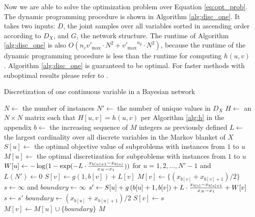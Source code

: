 
Now we are able to solve the optimization problem over Equation \ref{eq:opt_prob}.
The dynamic programming procedure is shown in Algorithm \ref{alg:disc_one}.
It takes two inputs: $D$, the joint samples over all variables sorted in ascending order according to $D_X$, and $G$, the network structure.
The runtime of Algorithm \ref{alg:disc_one} is also $O(n_c  {v'_\text{max}} \cdot N^2 + {v'_\text{max}}^{n_p} \cdot N^2)$, because the runtime of the dynamic programming procedure is less than the runtime for computing $h(u,v)$.
Algorithm \ref{alg:disc_one} is guaranteed to be optimal.
For faster methods with suboptimal results please refer to \citep{Boulle_2006}.

\begin{algorithm}
\caption{Discretization of one continuous variable in a Bayesian network}
\label{alg:disc_one}
\begin{algorithmic}[5]
\State
\State $N \leftarrow$ the number of instances
\State $N' \leftarrow$ the number of unique values in $D_X$
\State $H \leftarrow$ an $N \times N$ matrix such that $H[u,v] = h(u,v)$ per Algorithm \ref{alg:h} in the appendix
\State $b \leftarrow$ the increasing sequence of $M$ integers as previously defined
\State $L \leftarrow$ the largest cardinality over all discrete variables in the Markov blanket of $X$
\State $S[u] \leftarrow$ the optimal objective value of subproblems with instances from $1$ to $u$
\State $M[u] \leftarrow$ the optimal discretization for subproblems with instances from $1$ to $u$
\State $W[u]  \leftarrow - \log(1 - {\exp(- L \cdot{ {{x_{b(u)+1} - x_{b(u)}}\over{x_N - x_1}})}})$ for $u = 1,2, \ldots,N'-1$ and $L(N') \leftarrow 0$
\State
{}
\State $S[v] \leftarrow g \left(1,b[v] \right) + L[v]$
\State $M[v] \leftarrow \{ ({x_{b[v]} + x_{b[v]+1}}) / 2\}$
\Else
\State $s \leftarrow \infty$ and $boundary \leftarrow \infty$
\State $s' \leftarrow S[u] + g \left( b[u]+1,b[v] \right) +  {L \cdot {{x_{b[v]} - x_{b[u] + 1}}\over{x_N - x_1}}} + W[v]$
\State $s \leftarrow s'$
\State $boundary \leftarrow ({x_{b[u]} + x_{b[u]+1}}) / 2$
\EndIf
\EndFor
\State $S[v] \leftarrow s$
\State $M[v] \leftarrow M[u] \cup \{ boundary\}$
\EndIf
\EndFor
 \State \Return $M$
\EndFunction
\end{algorithmic}
\end{algorithm}


